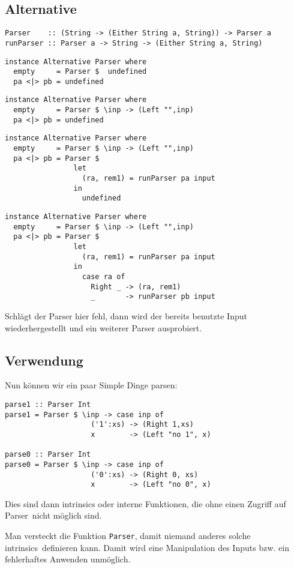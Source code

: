 \documentclass{beamer}
\begin{document}
\subsection{Alternative}
\begin{frame}[fragile]
\begin{verbatim}
Parser    :: (String -> (Either String a, String)) -> Parser a
runParser :: Parser a -> String -> (Either String a, String)
\end{verbatim}
\begin{overprint}
\begin{verbatim}
instance Alternative Parser where
  empty     = Parser $  undefined
  pa <|> pb = undefined
\end{verbatim}
\begin{verbatim}
instance Alternative Parser where
  empty     = Parser $ \inp -> (Left "",inp)
  pa <|> pb = undefined
\end{verbatim}
\begin{verbatim}
instance Alternative Parser where
  empty     = Parser $ \inp -> (Left "",inp)
  pa <|> pb = Parser $  
                let
                  (ra, rem1) = runParser pa input
                in
                  undefined
\end{verbatim}
\begin{verbatim}
instance Alternative Parser where
  empty     = Parser $ \inp -> (Left "",inp)
  pa <|> pb = Parser $  
                let
                  (ra, rem1) = runParser pa input
                in
                  case ra of
                    Right _ -> (ra, rem1)
                    _       -> runParser pb input
\end{verbatim}
Schlägt der Parser hier fehl, dann wird der bereits benutzte Input wiederhergestellt und ein weiterer Parser ausprobiert.
\end{overprint}
\end{frame}

\subsection{Verwendung}

\begin{frame}[fragile]
Nun können wir ein paar Simple Dinge parsen:\bigskip

\begin{verbatim}
parse1 :: Parser Int
parse1 = Parser $ \inp -> case inp of
                    ('1':xs) -> (Right 1,xs)
                    x        -> (Left "no 1", x)

parse0 :: Parser Int
parse0 = Parser $ \inp -> case inp of
                    ('0':xs) -> (Right 0, xs)
                    x        -> (Left "no 0", x)
\end{verbatim}
\pause
Dies sind dann intrinsics oder interne Funktionen, die ohne einen Zugriff auf \glqq Parser\grqq \ nicht möglich sind.\pause

Man versteckt die Funktion \texttt{Parser}, damit niemand anderes solche \glqq intrinsics\grqq \ definieren kann. Damit wird eine Manipulation des Inputs bzw. ein fehlerhaftes Anwenden unmöglich.
\end{frame}
\end{document}
